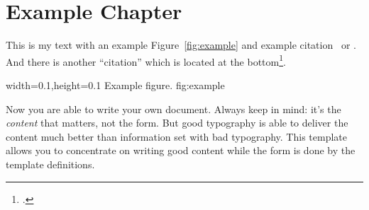 

\chapter{Example Chapter}

This is my text with an example Figure~\ref{fig:example} and example
citation~\cite{StrunkWhite} or \textcite{Bringhurst1993}. And there is another
\enquote{citation} which is located at the bottom\footcite{tagstore}.

  {width=0.1\textwidth,height=0.1\textheight}%
  {Example figure.}%
  {fig:example}%

Now you are able to write your own document. Always keep in mind: it's
the \emph{content} that matters, not the form. But good typography is
able to deliver the content much better than information set with bad
typography. This template allows you to concentrate on writing good
content while the form is done by the template definitions.


